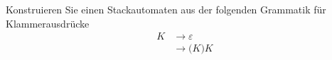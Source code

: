 Konstruieren Sie einen Stackautomaten aus der folgenden Grammatik
für Klammerausdrücke
\begin{align*}
K&\to \varepsilon \\
 &\to \texttt{(}K\texttt{)}K
\end{align*}

\begin{loesung}
\end{loesung}

